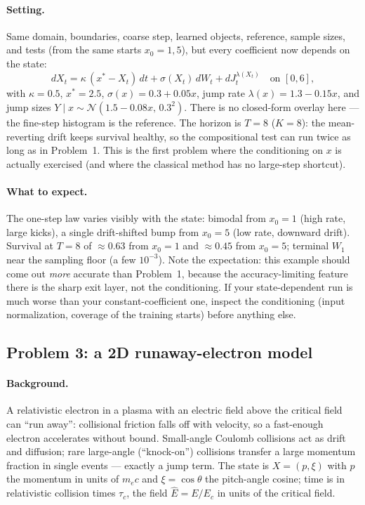 \documentclass[11pt]{article}
\begin{document}
\paragraph{Setting.} Same domain, boundaries, coarse step, learned
objects, reference, sample sizes, and tests (from the same starts
$x_0=1,5$), but every coefficient now depends on the state:
\begin{equation*}
dX_t = \kappa\,(x^*-X_t)\,dt + \sigma(X_t)\,dW_t + dJ_t^{\lambda(X_t)}
\quad\text{on } [0,6],
\end{equation*}
with $\kappa=0.5$, $x^*=2.5$, $\sigma(x)=0.3+0.05x$, jump rate
$\lambda(x)=1.3-0.15x$, and jump sizes
$Y\mid x\sim\mathcal N(1.5-0.08x,\,0.3^2)$. There is no closed-form
overlay here --- the fine-step histogram is the reference. The horizon is
$T=8$ ($K=8$): the mean-reverting drift keeps survival healthy, so the
compositional test can run twice as long as in Problem~1. This is the
first problem where the conditioning on $x$ is actually exercised (and
where the classical method has no large-step shortcut).

\paragraph{What to expect.} The one-step law varies visibly with the
state: bimodal from $x_0=1$ (high rate, large kicks), a single
drift-shifted bump from $x_0=5$ (low rate, downward drift). Survival at
$T=8$ of $\approx0.63$ from $x_0=1$ and $\approx0.45$ from $x_0=5$;
terminal $W_1$ near the sampling floor (a few $10^{-3}$). Note the
expectation: this example should come out \emph{more} accurate than
Problem~1, because the accuracy-limiting feature there is the sharp exit
layer, not the conditioning. If your state-dependent run is much worse
than your constant-coefficient one, inspect the conditioning (input
normalization, coverage of the training starts) before anything else.

\subsection{Problem 3: a 2D runaway-electron model}

\paragraph{Background.} A relativistic electron in a plasma with an
electric field above the critical field can ``run away'': collisional
friction falls off with velocity, so a fast-enough electron accelerates
without bound. Small-angle Coulomb collisions act as drift and diffusion;
rare large-angle (``knock-on'') collisions transfer a large momentum
fraction in single events --- exactly a jump term. The state is
$X=(p,\xi)$ with $p$ the momentum in units of $m_ec$ and
$\xi=\cos\theta$ the pitch-angle cosine; time is in relativistic
collision times $\tau_c$, the field $\hat E=E/E_c$ in units of the
critical field.
\end{document}

